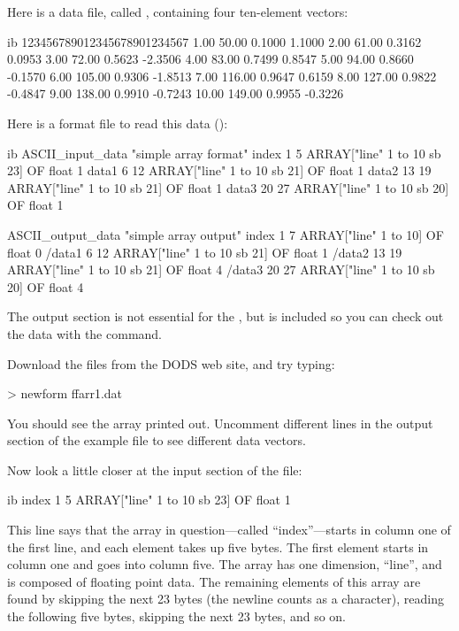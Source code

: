 Here is a data file, called
, containing
four ten-element vectors:

\begin{vcode}{ib}
123456789012345678901234567
 1.00  50.00 0.1000  1.1000
 2.00  61.00 0.3162  0.0953
 3.00  72.00 0.5623 -2.3506
 4.00  83.00 0.7499  0.8547
 5.00  94.00 0.8660 -0.1570
 6.00 105.00 0.9306 -1.8513
 7.00 116.00 0.9647  0.6159
 8.00 127.00 0.9822 -0.4847
 9.00 138.00 0.9910 -0.7243
10.00 149.00 0.9955 -0.3226
\end{vcode}

Here is a format file to read this data
():

\begin{vcode}{ib}
ASCII_input_data "simple array format"
index 1 5 ARRAY["line" 1 to 10 sb 23] OF float 1
data1 6 12 ARRAY["line" 1 to 10 sb 21] OF float 1
data2 13 19 ARRAY["line" 1 to 10 sb 21] OF float 1
data3 20 27 ARRAY["line" 1 to 10 sb 20] OF float 1

ASCII_output_data "simple array output"
index 1 7 ARRAY["line" 1 to 10] OF float 0
/data1 6 12 ARRAY["line" 1 to 10 sb 21] OF float 1
/data2 13 19 ARRAY["line" 1 to 10 sb 21] OF float 4
/data3 20 27 ARRAY["line" 1 to 10 sb 20] OF float 4
\end{vcode}

The output section is not essential for the \ffs , but is included so
you can check out the data with the  command.

Download the files from the DODS web site, and try typing:

\begin{example}
> newform ffarr1.dat
\end{example}

You should see the  array printed out.  Uncomment different
lines in the output section of the example file to see different data
vectors. 

Now look a little closer at the input section of the file:

\begin{vcode}{ib}
index 1 5 ARRAY["line" 1 to 10 sb 23] OF float 1
\end{vcode}

This line says that the array in question---called ``index''---starts
in column one of the first line, and each element takes up five bytes.
The first element starts in column one and goes into column five.  The
array has one dimension, ``line'', and is composed of floating point
data.  The remaining elements of this array are found by skipping the
next 23 bytes (the newline counts as a character), reading the
following five bytes, skipping the next 23 bytes, and so on.

